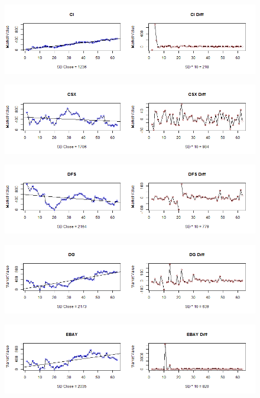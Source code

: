 \begin{figure}[!h]
	\includegraphics[scale=0.5]{images/appendixC/CI_FRST.png}
\end{figure}

\begin{figure}[!h]
	\includegraphics[scale=0.5]{images/appendixC/CSX_FRST.png}
\end{figure}

\begin{figure}[!h]
	\includegraphics[scale=0.5]{images/appendixC/DFS_FRST.png}
\end{figure}

\begin{figure}[!h]
	\includegraphics[scale=0.5]{images/appendixC/DG_FRST.png}
\end{figure}

\begin{figure}[!h]
	\includegraphics[scale=0.5]{images/appendixC/EBAY_FRST.png}
\end{figure}

